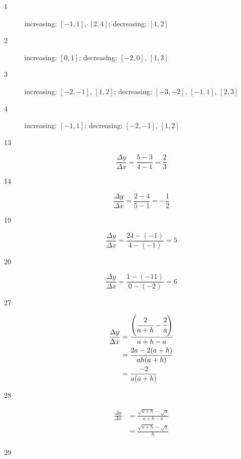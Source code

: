\documentclass{exam}
\begin{document}
  \begin{description}

    \item[1] increasing: $[-1, 1]$, $[2, 4]$; decreasing: $[1, 2]$

    \item[2] increasing: $[0, 1]$; decreasing: $[-2, 0]$, $[1, 3]$ 

    \item[3] increasing: $[-2, -1]$, $[1, 2]$; decreasing: $[-3, -2]$, $[-1, 1]$, $[2, 3]$ 

    \item[4] increasing: $[-1, 1]$; decreasing: $[-2, -1]$, $[1, 2]$ 

    \item[13]
      \[
        \frac{\Delta y}{\Delta x} = \frac{5 - 3}{4 - 1} = \frac{2}{3}
      \]

    \item[14]
      \[
        \frac{\Delta y}{\Delta x} = \frac{2 - 4}{5 - 1} = -\frac{1}{2}
      \]

    \item[19]
      \[
        \frac{\Delta y}{\Delta x} = \frac{24 - (-1)}{4 - (-1)} = 5
      \]

    \item[20]
      \[
        \frac{\Delta y}{\Delta x} = \frac{1 - (-11)}{0 - (-2)} = 6
      \]

    \item[27]
      \begin{align*}
        \frac{\Delta y}{\Delta x} &= \frac{\left( \cfrac{2}{a + h} - \cfrac{2}{a} \right)}{a + h - a} \\
          &= \frac{2a - 2(a + h)}{ah(a + h)} \\
          &= \frac{-2}{a(a + h)} \\
      \end{align*}

    \item[28]
      \begin{align*}
        \frac{\Delta y}{\Delta x} &= \frac{\sqrt{a + h} - \sqrt{a}}{a + h - a} \\
          &= \frac{\sqrt{a + h} - \sqrt{a}}{h} \\
      \end{align*}

    \item[29]
\end{description}
\end{document}
